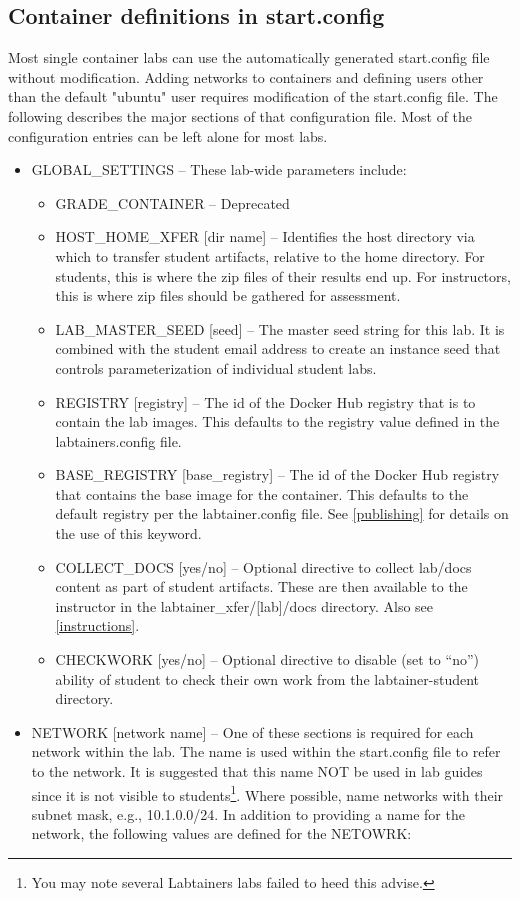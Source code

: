 \documentclass[12pt]{article}
\begin{document}
\subsection{Container definitions in start.config}
\label{start config}
Most single container labs can use the automatically generated start.config file
without modification.  Adding networks to containers and defining users other than the
default "ubuntu" user requires modification of the start.config file.
The following describes the major sections of that configuration file.  Most of the configuration
entries can be left alone for most labs.
\begin{itemize}
\item GLOBAL\_SETTINGS -- These lab-wide parameters include:

\begin{itemize}
\item GRADE\_CONTAINER -- Deprecated
\item HOST\_HOME\_XFER [dir name] --  Identifies the host directory via which to transfer student artifacts, relative to 
the home directory.  For students, this is where the zip files of their results end up.  For instructors, this is
where zip files should be gathered for assessment.
\item LAB\_MASTER\_SEED [seed] -- The master seed string for this lab.  It is combined with the student email
address to create an instance seed that controls parameterization of individual student labs.
\item REGISTRY [registry] -- The id of the Docker Hub registry that is to contain the lab images. This defaults to the
registry value defined in the labtainers.config file.
\item BASE\_REGISTRY [base\_registry] -- The id of the Docker Hub registry that contains the base image for the container.  This defaults
to the default registry per the labtainer.config file.
See \ref{publishing} for details on the use of this keyword.
\item COLLECT\_DOCS [yes/no] -- Optional directive to collect lab/docs content as part of student artifacts.
These are then available to the instructor in the labtainer\_xfer/[lab]/docs directory.  Also see \ref{instructions}.
\item CHECKWORK [yes/no] -- Optional directive to disable (set to ``no'') ability of student to check their own work from the labtainer-student directory.
\end{itemize}

\item NETWORK [network name] -- One of these sections is required for each network within the lab.  The name
is used within the start.config file to refer to the network.  It is suggested that this name NOT be
used in lab guides since it is not visible to students\footnote{You may note several Labtainers labs
failed to heed this advise.}. Where possible, name networks with their subnet mask, e.g., 10.1.0.0/24.
In addition to providing a name for the network, the following values are defined for the NETOWRK:


\end{itemize}
\end{document}
